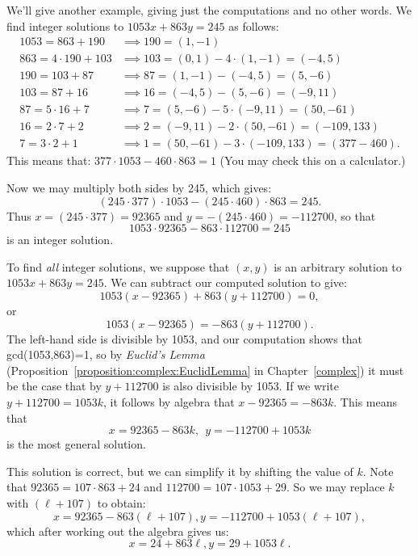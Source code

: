 \begin{example}{}
We'll give another example, giving just the computations and no other words. We find integer solutions to $1053x + 863y =245$ as follows:
\begin{align*}
1053 = 863 + 190 &\implies 190 = (1,-1)\\
863 = 4 \cdot 190 +103 & \implies 103 = (0,1) - 4\cdot (1,-1) = (-4,5)\\
190 = 103 + 87 &\implies 87 = (1,-1) - (-4,5) = (5,-6)\\
103 = 87  + 16 &\implies 16 = (-4,5) - (5,-6) = (-9,11)\\
87 = 5 \cdot 16 + 7 &\implies 7 = (5,-6) - 5\cdot (-9,11) = (50,-61)\\
16 = 2 \cdot 7 + 2 &\implies 2 = (-9,11) - 2 \cdot(50,-61) = (-109,133)\\
7 = 3 \cdot 2 + 1 &\implies 1 = (50,-61) - 3 \cdot(-109,133) = (377 -460).
\end{align*}
This means that:  $377 \cdot 1053  - 460 \cdot 863 = 1$  (You may check this on a calculator.)  

\noindent
Now we may multiply both sides by 245, which gives:  
$$(245 \cdot 377)\cdot 1053 - (245 \cdot 460)\cdot 863 = 245.$$
Thus $x=(245 \cdot 377) =92365$ and $y=- (245 \cdot 460) =-112700$, so that
$$1053 \cdot 92365  - 863 \cdot 112700 = 245$$ 
is an integer solution.

To find \emph{all} integer solutions, we suppose that $(x,y)$ is an arbitrary solution to  $1053x + 863y = 245$. We can  subtract our computed solution to give:
$$1053(x-92365) + 863(y+112700) = 0,$$
or
$$1053(x-92365) = -863(y+112700).$$
The left-hand side is divisible by 1053, and our computation shows that gcd(1053,863)=1, so by \emph{Euclid's Lemma} (Proposition~\ref{proposition:complex:EuclidLemma} in Chapter~\ref{complex}) it must be the case that by $y + 112700$ is also divisible by 1053.  If we write $y + 112700 = 1053k$, it follows by algebra that $x - 92365 = -863k$. This means that 
$$ x = 92365 - 863k,~~ y = -112700 + 1053k$$
is the most general solution.  

This solution is correct, but we can simplify it by shifting the value of $k$.  Note that $92365 = 107 \cdot 863 + 24$ and $112700 = 107 \cdot 1053 + 29$.  So we may replace $k$ with $(\ell + 107)$ to obtain:
$$ x = 92365 - 863(\ell + 107), y = -112700 + 1053(\ell + 107),$$
which after working out the algebra gives us:
$$ x = 24 + 863 \ell, y = 29 + 1053 \ell.$$
\end{example}
 
